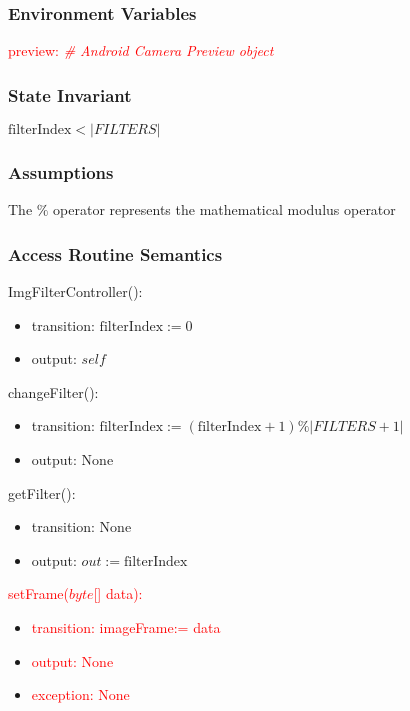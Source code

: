 \documentclass[12pt, titlepage]{article}
\begin{document}
\subsubsection* {Environment Variables}

\textcolor{red}{preview: \textit{\# Android Camera Preview object}}

\subsubsection* {State Invariant}

$\text{filterIndex} < |FILTERS|$

\subsubsection* {Assumptions}

The $\%$ operator represents the mathematical modulus operator

\subsubsection* {Access Routine Semantics}

ImgFilterController():
\begin{itemize}
\item transition: $\text{filterIndex} := 0$
\item output: $self$
\end{itemize}

\noindent changeFilter():
\begin{itemize}
\item transition: $\text{filterIndex} := (\text{filterIndex} + 1) \% |FILTERS + 1|$
\item output: None

\end{itemize}

\noindent getFilter():
\begin{itemize}
\item transition: None
\item output: $out := \text{filterIndex}$
\end{itemize}

\noindent \textcolor{red}{setFrame($byte$[] data):}
\begin{itemize}
\item \textcolor{red}{transition: imageFrame:= data}
\item \textcolor{red}{output: None}
\item \textcolor{red}{exception: None}
\end{itemize}
\end{document}
